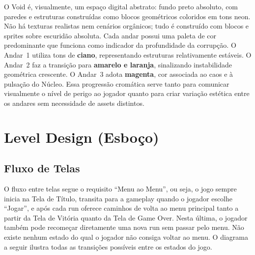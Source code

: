 \documentclass[12pt, a4paper]{article}
\begin{document}
O Void \'e, visualmente, um espa\c{c}o digital abstrato: fundo preto absoluto, com paredes e estruturas constru\'idas como blocos geom\'etricos coloridos em tons neon. N\~ao h\'a texturas realistas nem cen\'arios org\^anicos; tudo \'e constru\'ido com blocos e sprites sobre escurid\~ao absoluta. Cada andar possui uma paleta de cor predominante que funciona como indicador da profundidade da corrup\c{c}\~ao. O Andar~1 utiliza tons de \textcolor{cyanfloor}{\textbf{ciano}}, representando estruturas relativamente est\'aveis. O Andar~2 faz a transi\c{c}\~ao para \textcolor{yellowfloor!80!black}{\textbf{amarelo e laranja}}, sinalizando instabilidade geom\'etrica crescente. O Andar~3 adota \textcolor{magentafloor}{\textbf{magenta}}, cor associada ao caos e \`a pulsa\c{c}\~ao do N\'ucleo. Essa progress\~ao crom\'atica serve tanto para comunicar visualmente o n\'ivel de perigo ao jogador quanto para criar varia\c{c}\~ao est\'etica entre os andares sem necessidade de assets distintos.

\newpage
\section{Level Design (Esbo\c{c}o)}

\subsection{Fluxo de Telas}

O fluxo entre telas segue o requisito ``Menu ao Menu'', ou seja, o jogo sempre inicia na Tela de T\'itulo, transita para a gameplay quando o jogador escolhe ``Jogar'', e ap\'os cada run oferece caminhos de volta ao menu principal tanto a partir da Tela de Vit\'oria quanto da Tela de Game Over. Nesta \'ultima, o jogador tamb\'em pode recome\c{c}ar diretamente uma nova run sem passar pelo menu. N\~ao existe nenhum estado do qual o jogador n\~ao consiga voltar ao menu. O diagrama a seguir ilustra todas as transi\c{c}\~oes poss\'iveis entre os estados do jogo.
\end{document}
